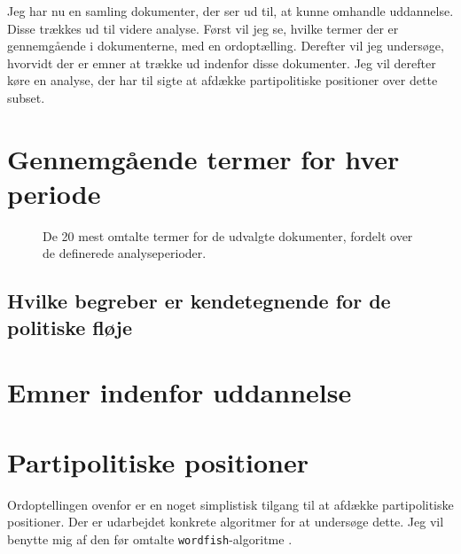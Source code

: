 Jeg har nu en samling dokumenter, der ser ud til, at kunne omhandle uddannelse.
Disse trækkes ud til videre analyse.
Først vil jeg se, hvilke termer der er gennemgående i dokumenterne, med en ordoptælling.
Derefter vil jeg undersøge, hvorvidt der er emner at trække ud indenfor disse dokumenter.
Jeg vil derefter køre en analyse, der har til sigte at afdække partipolitiske positioner over dette subset.

\section{Gennemgående termer for hver periode}

\begin{figure}
  \caption{De 20 mest omtalte termer for de udvalgte dokumenter, fordelt over de definerede analyseperioder.} 
\end{figure}

\subsection{Hvilke begreber er kendetegnende for de politiske fløje}

\section{Emner indenfor uddannelse}

\section{Partipolitiske positioner}

Ordoptellingen ovenfor er en noget simplistisk tilgang til at afdække partipolitiske positioner.
Der er udarbejdet konkrete algoritmer for at undersøge dette.
Jeg vil benytte mig af den før omtalte \texttt{wordfish}-algoritme \autocite{slapinScalingModelEstimating2008}.


